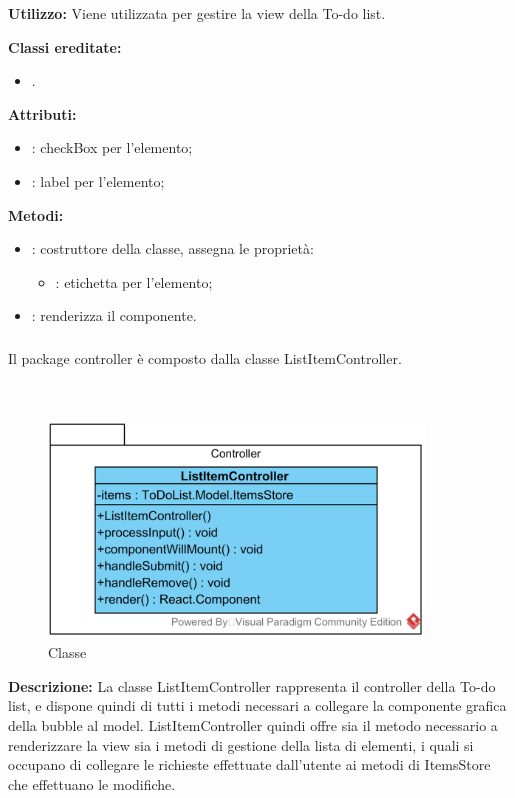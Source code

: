 \textbf{Utilizzo:}
Viene utilizzata per gestire la view della To-do list.

\textbf{Classi ereditate:}
\begin{itemize}
	\item {}.
\end{itemize}

\textbf{Attributi:}
\begin{itemize}
	\item {}: checkBox per l'elemento;
	\item {}: label per l'elemento; 
\end{itemize}

\textbf{Metodi:}
\begin{itemize}
	\item {}: costruttore della classe, assegna le proprietà:
	\begin{itemize}
		\item {}: etichetta per l'elemento;
	\end{itemize}
	\item {}: renderizza il componente.
\end{itemize}

\subsubsection[::Controller]{\class} \label{\class}
Il package controller è composto dalla classe ListItemController.


\paragraph[::ListItemController]{\class}\mbox{}\\ \label{\class}
\begin{figure}[H]
	\centering
	\includegraphics[width=10cm]{./diagrammi/todo/todocontroller.png}
	\caption{Classe \class}
\end{figure}
\textbf{Descrizione:}
La classe ListItemController rappresenta il controller della To-do list, e dispone quindi di tutti i metodi necessari a collegare la componente grafica della bubble al model. ListItemController quindi offre sia il metodo necessario a renderizzare la view sia i metodi di gestione della lista di elementi, i quali si occupano di collegare le richieste effettuate dall'utente ai metodi di ItemsStore che effettuano le modifiche.

